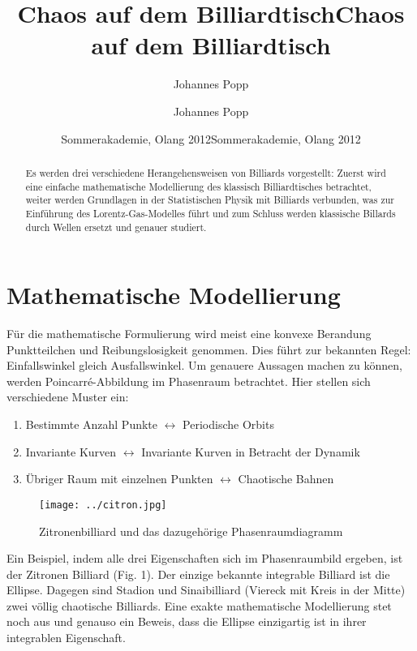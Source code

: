 \documentclass{article}
\title{Chaos auf dem Billiardtisch}
\author{Johannes Popp}
\date{Sommerakademie, Olang 2012}
\begin{document}
 
 \title{Chaos auf dem Billiardtisch}
 \author{Johannes Popp}
 \date{Sommerakademie, Olang 2012}
 \maketitle
 \begin{abstract}
 Es werden drei verschiedene Herangehensweisen von Billiards vorgestellt: Zuerst wird eine einfache mathematische Modellierung des klassisch Billiardtisches betrachtet, weiter werden Grundlagen in der Statistischen Physik mit Billiards verbunden, was zur Einf\"{u}hrung des Lorentz-Gas-Modelles f\"{u}hrt und zum Schluss werden klassische Billards durch Wellen ersetzt und genauer studiert.
 \end{abstract}
 
 \section{Mathematische Modellierung}
 
 F\"{u}r die mathematische Formulierung wird meist eine konvexe Berandung Punkt\-teilchen und Reibungslosigkeit genommen. Dies f\"{u}hrt zur bekannten Regel: Einfallswinkel gleich Ausfallswinkel. Um genauere Aussagen machen zu k\"{o}nnen, werden Poincarr\'{e}-Abbildung im Phasenraum betrachtet. Hier stellen sich verschiedene Muster ein:
 
 
 \begin{enumerate}
 \item Bestimmte Anzahl Punkte $\leftrightarrow$ Periodische Orbits
 \item Invariante Kurven $\leftrightarrow$ Invariante Kurven in Betracht der
 Dynamik
 \item \"{U}briger Raum mit einzelnen Punkten $\leftrightarrow$ Chaotische Bahnen
 \end{enumerate}
 
 
 \begin{wrapfigure}{l}{0.5\textwidth}
 \vspace{-20pt}
 \begin{center}
 \texttt{[image: ../citron.jpg]}
  \end{center}
  \vspace{-20pt}
  \caption{Zitronenbilliard und das dazugeh\"{o}rige Phasenraumdiagramm}

 \end{wrapfigure}
 
 
 Ein Beispiel, indem alle drei Eigenschaften sich im Phasenraumbild ergeben, ist der Zitronen Billiard (Fig. 1). Der einzige bekannte integrable Billiard ist die Ellipse. Dagegen sind Stadion und Sinaibilliard (Viereck mit Kreis in der Mitte) zwei v\"{o}llig chaotische Billiards. Eine exakte mathematische Modellierung stet noch aus und genauso ein Beweis, dass die Ellipse einzigartig ist in ihrer integrablen Eigenschaft.
 
\end{document}

